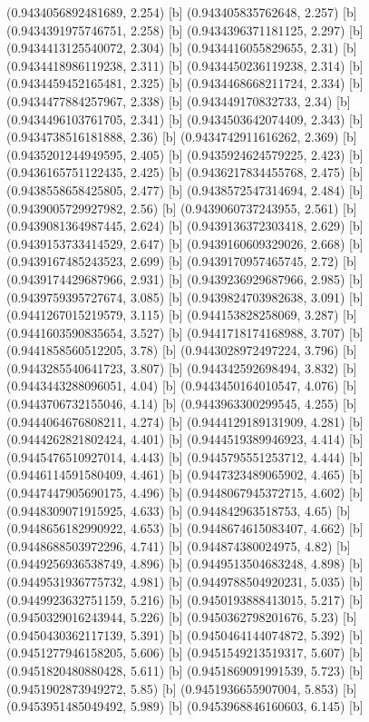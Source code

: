 {{{(0.9434056892481689, 2.254) [b] 
(0.943405835762648, 2.257) [b] 
(0.9434391975746751, 2.258) [b] 
(0.9434396371181125, 2.297) [b] 
(0.9434413125540072, 2.304) [b] 
(0.9434416055829655, 2.31) [b] 
(0.9434418986119238, 2.311) [b] 
(0.9434450236119238, 2.314) [b] 
(0.9434459452165481, 2.325) [b] 
(0.9434468668211724, 2.334) [b] 
(0.9434477884257967, 2.338) [b] 
(0.943449170832733, 2.34) [b] 
(0.9434496103761705, 2.341) [b] 
(0.9434503642074409, 2.343) [b] 
(0.9434738516181888, 2.36) [b] 
(0.9434742911616262, 2.369) [b] 
(0.9435201244949595, 2.405) [b] 
(0.9435924624579225, 2.423) [b] 
(0.9436165751122435, 2.425) [b] 
(0.9436217834455768, 2.475) [b] 
(0.9438558658425805, 2.477) [b] 
(0.9438572547314694, 2.484) [b] 
(0.9439005729927982, 2.56) [b] 
(0.9439060737243955, 2.561) [b] 
(0.9439081364987445, 2.624) [b] 
(0.9439136372303418, 2.629) [b] 
(0.9439153733414529, 2.647) [b] 
(0.9439160609329026, 2.668) [b] 
(0.9439167485243523, 2.699) [b] 
(0.9439170957465745, 2.72) [b] 
(0.9439174429687966, 2.931) [b] 
(0.9439236929687966, 2.985) [b] 
(0.9439759395727674, 3.085) [b] 
(0.9439824703982638, 3.091) [b] 
(0.9441267015219579, 3.115) [b] 
(0.944153828258069, 3.287) [b] 
(0.9441603590835654, 3.527) [b] 
(0.9441718174168988, 3.707) [b] 
(0.9441858560512205, 3.78) [b] 
(0.9443028972497224, 3.796) [b] 
(0.9443285540641723, 3.807) [b] 
(0.944342592698494, 3.832) [b] 
(0.9443443288096051, 4.04) [b] 
(0.9443450164010547, 4.076) [b] 
(0.9443706732155046, 4.14) [b] 
(0.9443963300299545, 4.255) [b] 
(0.9444064676808211, 4.274) [b] 
(0.9444129189131909, 4.281) [b] 
(0.9444262821802424, 4.401) [b] 
(0.9444519389946923, 4.414) [b] 
(0.9445476510927014, 4.443) [b] 
(0.9445795551253712, 4.444) [b] 
(0.9446114591580409, 4.461) [b] 
(0.9447323489065902, 4.465) [b] 
(0.9447447905690175, 4.496) [b] 
(0.9448067945372715, 4.602) [b] 
(0.9448309071915925, 4.633) [b] 
(0.944842963518753, 4.65) [b] 
(0.9448656182990922, 4.653) [b] 
(0.9448674615083407, 4.662) [b] 
(0.9448688503972296, 4.741) [b] 
(0.944874380024975, 4.82) [b] 
(0.9449256936538749, 4.896) [b] 
(0.9449513504683248, 4.898) [b] 
(0.9449531936775732, 4.981) [b] 
(0.9449788504920231, 5.035) [b] 
(0.9449923632751159, 5.216) [b] 
(0.9450193888413015, 5.217) [b] 
(0.9450329016243944, 5.226) [b] 
(0.9450362798201676, 5.23) [b] 
(0.9450430362117139, 5.391) [b] 
(0.9450464144074872, 5.392) [b] 
(0.9451277946158205, 5.606) [b] 
(0.9451549213519317, 5.607) [b] 
(0.9451820480880428, 5.611) [b] 
(0.9451869091991539, 5.723) [b] 
(0.9451902873949272, 5.85) [b] 
(0.9451936655907004, 5.853) [b] 
(0.9453951485049492, 5.989) [b] 
(0.9453968846160603, 6.145) [b] 
}}}
